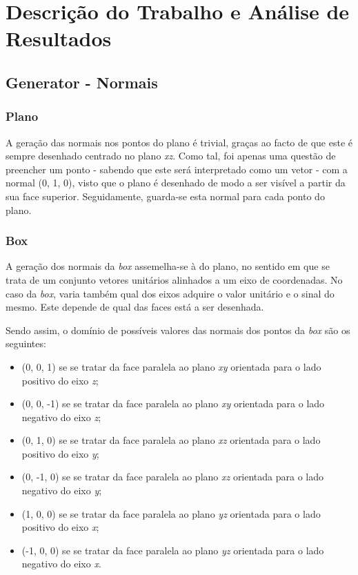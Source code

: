 \documentclass[a4paper]{article}
\begin{document}
\hspace{3mm} 

\section{Descrição do Trabalho e Análise de Resultados}


\subsection{Generator - Normais} 

\subsubsection{Plano}%

\hspace{3mm}A geração das normais nos pontos do plano é trivial, graças ao facto de que este é sempre desenhado centrado no plano \textit{xz}. Como tal, foi apenas uma questão de preencher um ponto - sabendo que este será interpretado como um vetor - com a normal (0, 1, 0), visto que o plano é desenhado de modo a ser visível a partir da sua face superior. Seguidamente, guarda-se esta normal para cada ponto do plano.

\subsubsection{Box}%

\hspace{3mm}A geração dos normais da \textit{box} assemelha-se à do plano, no sentido em que se trata de um conjunto vetores unitários alinhados a um eixo de coordenadas. No caso da \textit{box}, varia também qual dos eixos adquire o valor unitário e o sinal do mesmo. Este depende de qual das faces está a ser desenhada.

Sendo assim, o domínio de possíveis valores das normais dos pontos da \textit{box} são os seguintes:
\begin{itemize}
    \item (0, 0, 1) se se tratar da face paralela ao plano \textit{xy} orientada para o lado positivo do eixo \textit{z};
    \item (0, 0, -1) se se tratar da face paralela ao plano \textit{xy} orientada para o lado negativo do eixo \textit{z};
    \item (0, 1, 0) se se tratar da face paralela ao plano \textit{xz} orientada para o lado positivo do eixo \textit{y};
    \item (0, -1, 0) se se tratar da face paralela ao plano \textit{xz} orientada para o lado negativo do eixo \textit{y};
    \item (1, 0, 0) se se tratar da face paralela ao plano \textit{yz} orientada para o lado positivo do eixo \textit{x};
    \item (-1, 0, 0) se se tratar da face paralela ao plano \textit{yz} orientada para o lado negativo do eixo \textit{x}.
\end{itemize}
\end{document}
